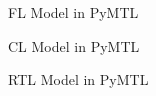 \begin{frame}{FL Model in PyMTL}
\end{frame}

\begin{frame}{CL Model in PyMTL}
\end{frame}

\begin{frame}{RTL Model in PyMTL}
\end{frame}
